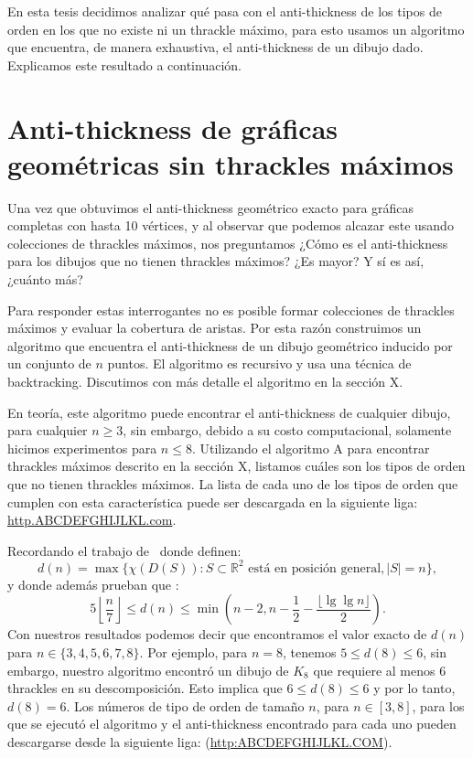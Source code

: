   En esta tesis decidimos analizar qué pasa con el anti-thickness de los tipos de orden en los que no
  existe ni un thrackle máximo, para esto usamos un algoritmo que encuentra, de manera exhaustiva, el
  anti-thickness de un dibujo dado. Explicamos este resultado a continuación.

  \section{Anti-thickness de gráficas geométricas sin thrackles máximos}

  Una vez que obtuvimos el anti-thickness geométrico exacto para gráficas completas con hasta 10 vértices,
  y al observar que podemos alcazar este usando colecciones de thrackles máximos, nos preguntamos ¿Cómo es
  el anti-thickness para los dibujos que no tienen thrackles máximos? ¿Es mayor? Y sí es así, ¿cuánto más?

  Para responder estas interrogantes no es posible formar colecciones de thrackles máximos y evaluar la
  cobertura de aristas. Por esta razón construimos un algoritmo que encuentra el anti-thickness de un
  dibujo geométrico inducido por un conjunto de $n$ puntos. El algoritmo es recursivo y usa una técnica
  de backtracking. Discutimos con más detalle el algoritmo en la sección X.

  En teoría, este algoritmo puede encontrar el anti-thickness de cualquier dibujo, para cualquier $n \geq
  3$, sin embargo, debido a su costo computacional, solamente hicimos experimentos para $n\leq 8$.
  Utilizando el algoritmo A para encontrar thrackles máximos descrito en la sección X, listamos cuáles
  son los tipos de orden que no tienen thrackles máximos. La lista de cada uno de los tipos de orden que
  cumplen con esta característica puede ser descargada en la siguiente liga: \url{http.ABCDEFGHIJLKL.com}.

  Recordando el trabajo de~\cite{Araujo2005} donde definen:
  \[
  d(n) = \max\{\chi(D(S)): S\subset \mathbb{R}^2 \text{ está en posición general}, |S|=n\},
  \]
  y donde además prueban que :
  \[
  5\left\lfloor\frac{n}{7}\right\rfloor \leq d(n) \leq \min(n-2,n-\frac{1}{2}-\frac{\lfloor \lg \lg n\rfloor}{2}).
  \]
  Con nuestros resultados podemos decir que encontramos el valor exacto de $d(n)$ para
  $n\in\{3,4,5,6,7,8\}$. Por ejemplo, para $n=8$, tenemos $5 \leq d(8) \leq 6$, sin embargo, nuestro
  algoritmo encontró un dibujo de $K_8$ que requiere al menos 6 thrackles en su descomposición. Esto
  implica que $6 \leq d(8) \leq 6$ y por lo tanto, $d(8) = 6$. Los números de tipo de orden de tamaño $n$, para $n \in [3,8]$, para los que se ejecutó el  algoritmo y el anti-thickness encontrado para cada uno pueden descargarse desde la siguiente liga: (\url{http:ABCDEFGHIJLKL.COM}).

